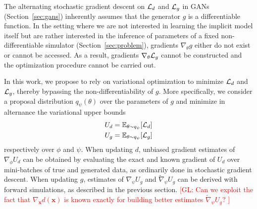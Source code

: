 \documentclass[twocolumn,superscriptaddress,aps]{revtex4-1}
\newcommand{\glnote}[1]{\textcolor{red}{[GL: #1]}}
\theoremstyle{plain}
\begin{document}
The alternating stochastic gradient descent on ${\cal L}_d$ and ${\cal L}_g$ in
GANs (Section~\ref{sec:gans}) inherently assumes that the generator $g$ is a differentiable function. In
the setting where we are not interested in learning the implicit model itself but are
rather interested in the inference of parameters of a fixed
non-differentiable simulator (Section~\ref{sec:problem}),
gradients $\nabla_\theta g$ either do not exist or cannot be accessed. As a
result, gradients $\nabla_\theta {\cal L}_g$ cannot be constructed and the
optimization procedure cannot be carried out.

In this work, we propose to rely on variational optimization to minimize ${\cal
L}_d$ and ${\cal L}_g$, thereby bypassing the non-differentiability of $g$. More
specifically, we consider a proposal distribution $q_\psi(\theta)$ over the
parameters of $g$ and minimize in alternance the variational upper bounds
\begin{align}
    U_d &= \mathbb{E}_{\theta \sim q_\psi} [ {\cal L}_d ] \label{eqn:vo-ud} \\
    U_g &= \mathbb{E}_{\theta \sim q_\psi} [ {\cal L}_g ] \label{eqn:vo-ug}
\end{align} respectively over $\phi$ and $\psi$.
When updating
$d$, unbiased gradient estimates of $\nabla_\phi U_d$ can be obtained by
evaluating the exact and known gradient of $U_d$ over mini-batches of true and
generated data, as ordinarily done in stochastic gradient descent. When updating
$g$, estimates of $\nabla_\psi U_g$ and $\tilde{\nabla}_\psi U_g$ can be derived with forward
simulations, as described in the previous section.
\glnote{Can we exploit the fact that $\nabla_\mathbf{x} d(\mathbf{x})$
is known exactly for building better estimates $\tilde{\nabla}_\psi U_g$?
}
\end{document}
